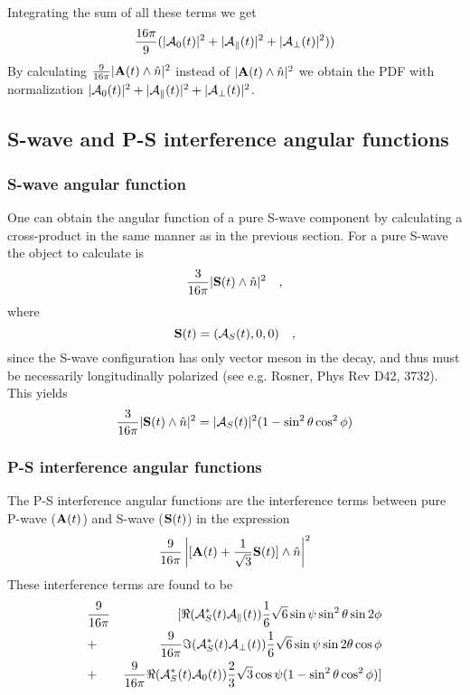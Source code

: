 \documentclass[a4paper,10pt,twosided]{article}
\begin{document}
Integrating the sum of all these terms we get
\begin{equation}
\frac{16\pi}{9}(|{\cal A}_{0}(t)|^{2}+|{\cal A}_{\parallel}(t)|^{2}+|{\cal A}_{\perp}(t)|^{2}))
\end{equation}
By calculating  $\frac{9}{16\pi}|{ \bf A}(t) \wedge \hat{n}|^2$ instead of $|{ \bf A}(t) \wedge \hat{n}|^2$ we obtain the PDF with normalization $|{\cal A}_{0}(t)|^{2}+|{\cal A}_{\parallel}(t)|^{2}+|{\cal A}_{\perp}(t)|^{2}$. 
\subsection{S-wave and P-S interference angular functions}\label{sec:Swaveangles}
\subsubsection{S-wave angular function}
One can obtain the angular function of a pure S-wave component by calculating a cross-product in the same manner as in the previous section. For a pure S-wave the object to calculate is
\begin{equation}
\frac{3}{16\pi}|{\bf S}(t) \wedge \hat{n}|^2\quad,
\end{equation}
where
\begin{equation}
{\bf S}(t) = ({\cal A}_{S}(t),0,0) \quad ,
\end{equation}
since the S-wave configuration has only vector meson in the decay, and thus must be necessarily longitudinally polarized (see e.g. Rosner, Phys Rev D42, 3732). This yields
\begin{equation}
\frac{3}{16\pi}|{\bf S}(t) \wedge \hat{n}|^{2}=|{\cal A}_{S}(t)|^2 (1-\sin^2\theta\cos^2\phi)
\end{equation}
\subsubsection{P-S interference angular functions}
The P-S interference angular functions are the interference terms between pure P-wave (${ \bf A}(t)$) and S-wave (${ \bf S}(t)$) in the expression
\begin{equation}
\frac{9}{16\pi}\left|[{ \bf A}(t) + \frac{1}{\sqrt{3}}{\bf S}(t)] \wedge \hat{n}\right|^2
\end{equation}
These interference terms are found to be
\begin{eqnarray}
&\frac{9}{16\pi}&[\Re({\cal{A}}_S^*(t){\cal{A}}_\parallel(t))\frac{1}{6}\sqrt{6}\sin\psi\sin^2\theta\sin 2\phi \\
&+&\frac{9}{16\pi}\Im({\cal{A}}_S^*(t){\cal{A}}_\perp(t))\frac{1}{6}\sqrt{6}\sin\psi\sin2\theta\cos\phi \\
&+&\frac{9}{16 \pi}\Re({\cal{A}}_S^*(t){\cal{A}}_0(t))\frac{2}{3}\sqrt{3}\cos\psi(1-\sin^2\theta\cos^2\phi)]
\end{eqnarray}
\end{document}
